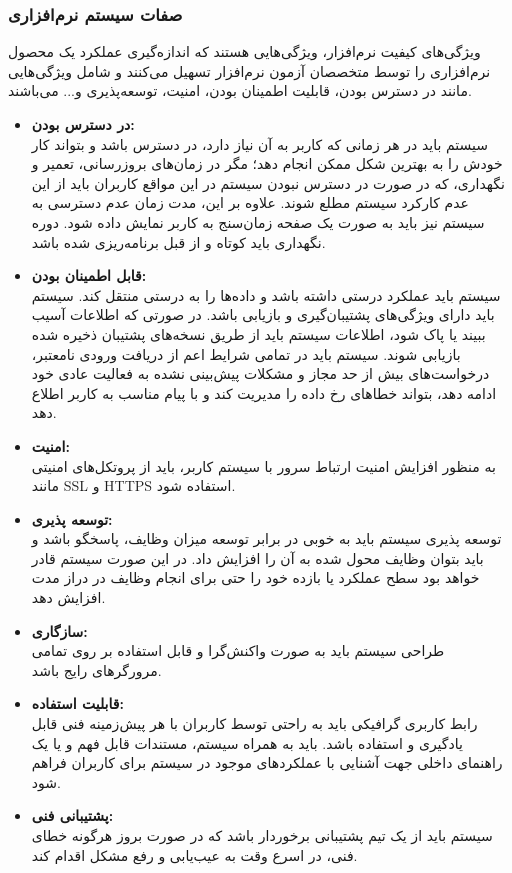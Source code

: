 \documentclass[12pt]{article}
\begin{document}
	\subsubsection{صفات سیستم نرم‌افزاری}
	ویژگی‌های کیفیت نرم‌افزار، ویژگی‌هایی هستند که اندازه‌گیری عملکرد یک محصول نرم‌افزاری را توسط متخصصان آزمون نرم‌افزار تسهیل می‌کنند و شامل ویژگی‌هایی مانند در دسترس بودن، قابلیت اطمینان بودن، امنیت، توسعه‌پذیری و... می‌باشند.
	\begin{itemize}
		\item
		\textbf{در دسترس بودن:}\\
		سیستم باید در هر زمانی که کاربر به آن نیاز دارد، در دسترس باشد و بتواند کار خودش را به بهترین شکل ممکن انجام دهد؛ مگر در زمان‌های بروزرسانی، تعمیر و نگهداری، که در صورت در دسترس نبودن سیستم در این مواقع کاربران باید از این عدم کارکرد سیستم مطلع شوند. علاوه بر این، مدت زمان عدم دسترسی به سیستم نیز باید به صورت یک صفحه زمان‌سنج به کاربر نمایش داده شود. دوره نگهداری باید کوتاه و از قبل برنامه‌ریزی شده باشد.
		\item
		\textbf{قابل اطمینان بودن:}\\
		سیستم باید عملکرد درستی داشته باشد و داده‌ها را به درستی منتقل کند. سیستم باید دارای ویژگی‌های پشتیبان‌گیری و بازیابی باشد. در صورتی که اطلاعات آسیب ببیند یا پاک شود، اطلاعات سیستم باید از طریق نسخه‌های پشتیبان ذخیره شده بازیابی شوند. سیستم باید در تمامی شرایط اعم از دریافت ورودی نامعتبر، درخواست‌های بیش از حد مجاز و مشکلات پیش‌بینی نشده به فعالیت عادی خود ادامه دهد، بتواند خطاهای رخ داده را مدیریت کند و با پیام مناسب به کاربر اطلاع دهد.
		\item
		\textbf{امنیت:}\\
		به منظور افزایش امنیت ارتباط سرور با سیستم کاربر، باید از پروتکل‌های امنیتی مانند SSL و HTTPS استفاده شود.
		\item
		\textbf{توسعه پذیری:}\\
		توسعه پذیری سیستم باید به خوبی در برابر توسعه میزان وظایف، پاسخگو باشد و باید بتوان وظایف محول شده به آن را افزایش داد. در این صورت سیستم قادر خواهد بود سطح عملکرد یا بازده خود را حتی برای انجام وظایف در دراز مدت افزایش دهد.
		\item
		\textbf{سازگاری:}\\
		طراحی سیستم باید به صورت واکنش‌گرا و قابل استفاده بر روی تمامی مرورگرهای رایج باشد.
		\item
		\textbf{قابلیت استفاده:}\\
		رابط کاربری گرافیکی باید به راحتی توسط کاربران با هر پیش‌زمینه فنی قابل یادگیری و استفاده باشد. باید به همراه سیستم، مستندات قابل فهم و یا یک راهنمای داخلی جهت آشنایی با عملکردهای موجود در سیستم برای کاربران فراهم شود.
		\item
		\textbf{پشتیبانی فنی:}\\
		سیستم باید از یک تیم پشتیبانی برخوردار باشد که در صورت بروز هرگونه خطای فنی، در اسرع وقت به عیب‌یابی و رفع مشکل اقدام کند.

	\end{itemize}
\end{document}
